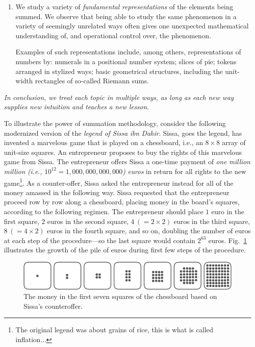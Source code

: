 \begin{enumerate}
\medskip\item
We study a variety of {\it fundamental representations} of the elements being summed.  We observe that being able to study the same phenomenon in a variety of seemingly unrelated ways often gives one unexpected mathematical understanding of, and operational control over, the phenomenon.

\smallskip

Examples of such representations include, among others, representations of numbers by: numerals in a positional number system; slices of pie; tokens arranged in stylized ways; basic geometrical structures, including the unit-width rectangles of so-called Riemann sums.
\end{enumerate}

\medskip

\noindent
{\em In conclusion, we treat each topic in multiple ways, as long as each new way supplies new intuition and teaches a new lesson.}

\bigskip


To illustrate the power of summation methodology, consider the following modernized version of the {\it legend of Sissa ibn Dahir}.  Sissa, goes the legend, has invented a marvelous game that is played on a chessboard, i.e., an $8 \times 8$ array of unit-size squares.  An entrepreneur proposes to buy the rights of this marvelous game from Sissa.  The entrepreneur offers Sissa a one-time payment of {\em one million million (i.e., $10^{12} = 1,000,000,000,000$) euros} in return for all rights to the new game\footnote{The original legend was about grains of rice, this is what is called {inflation}...}.  As a counter-offer, Sissa asked the entrepreneur instead for all of the money amassed in the following way.  Sissa requested that the entrepreneur proceed row by row along a chessboard, placing money in the board's squares, according to the following regimen.  The entrepreneur should place $1$ euro in the first square, $2$ euros in the second square, $4 \ (= 2 \times 2)$ euros in the third square, $8 \ (= 4 \times 2)$ euros in the
fourth square, and so on, doubling the number of euros at each step of the procedure---so the last square would contain $2^{63}$ euros. Fig.~\ref{fig:Sissa} illustrates the growth of the pile of euros during first few steps of the procedure.
\begin{figure}[ht]
\begin{center}
       \includegraphics[scale=0.3]{FiguresMaths/chess}
\caption{The money in the first seven squares of the chessboard based on Sissa's counteroffer.}
       \label{fig:Sissa}
\end{center}
\end{figure}

